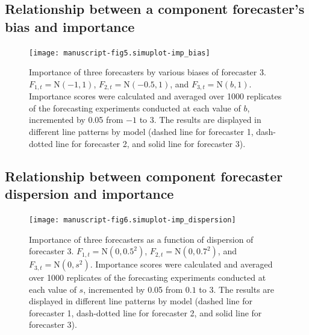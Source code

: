 \documentclass{article}
\theoremstyle{definition}
\begin{document}
\subsection{Relationship between a component forecaster's bias and importance}


\begin{figure}[h!]
	\centering
\texttt{[image: manuscript-fig5.simuplot-imp\_bias]}
	\caption{Importance of three forecasters by various biases of forecaster 3. $F_{1,t} = \text{N}(-1, 1)$, $F_{2,t} = \text{N}(-0.5, 1)$, and $F_{3,t} = \text{N}(b, 1)$. Importance scores were calculated and averaged over 1000 replicates of the forecasting experiments conducted at each value of $b$, incremented by 0.05 from $-1$ to $3$. The results are displayed in different line patterns by model (dashed line for forecaster 1, dash-dotted line for forecaster 2, and solid line for forecaster 3). }
	\label{fig:simuplot-imp_bias}
\end{figure}

\newpage
\subsection{Relationship between component forecaster dispersion and importance}


\begin{figure}[h!]
	\centering
\texttt{[image: manuscript-fig6.simuplot-imp\_dispersion]}
	\caption{Importance of three forecasters as a function of dispersion of forecaster 3. $F_{1,t} = \text{N}(0, 0.5^2)$, $F_{2,t} = \text{N}(0, 0.7^2)$, and $F_{3,t} = \text{N}(0, s^2).$ Importance scores were calculated and averaged over 1000 replicates of the forecasting experiments conducted at each value of $s$, incremented by 0.05 from $0.1$ to $3$. The results are displayed in different line patterns by model (dashed line for forecaster 1, dash-dotted line for forecaster 2, and solid line for forecaster 3).}
	\label{fig:simuplot-imp_dispersion}
\end{figure}
\end{document}
